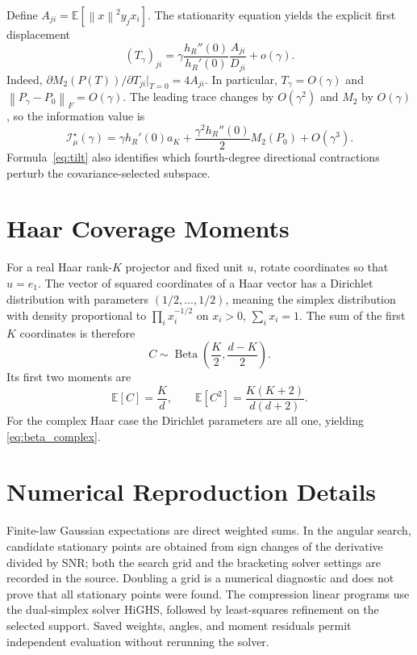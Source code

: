 \documentclass[lettersize,onecolumn]{IEEEtran}
\theoremstyle{remark}
\theoremstyle{definition}
\newcommand{\EE}{\mathbb E}
\newcommand{\norm}[1]{\left\lVert #1\right\rVert}
\newcommand{\I}{\mathcal I}
\begin{document}
Define $A_{ji}=\EE[\norm x^2y_jx_i]$. The stationarity equation yields the explicit first displacement
\begin{equation}
(T_\gamma)_{ji}=\gamma\frac{h_R''(0)}{h_R'(0)}\frac{A_{ji}}{D_{ji}}+o(\gamma).
\label{eq:tilt}
\end{equation}
Indeed, $\partial M_2(P(T))/\partial T_{ji}|_{T=0}=4A_{ji}$. In particular, $T_\gamma=O(\gamma)$ and $\norm{P_\gamma-P_0}_F=O(\gamma)$. The leading trace changes by $O(\gamma^2)$ and $M_2$ by $O(\gamma)$, so the information value is
\begin{equation}
\I_\mu^\star(\gamma)=\gamma h_R'(0)a_K+\frac{\gamma^2h_R''(0)}2M_2(P_0)+O(\gamma^3).
\end{equation}
Formula~\eqref{eq:tilt} also identifies which fourth-degree directional contractions perturb the covariance-selected subspace.

\section{Haar Coverage Moments}
For a real Haar rank-$K$ projector and fixed unit $u$, rotate coordinates so that $u=e_1$. The vector of squared coordinates of a Haar vector has a Dirichlet distribution with parameters $(1/2,\ldots,1/2)$, meaning the simplex distribution with density proportional to $\prod_i x_i^{-1/2}$ on $x_i>0$, $\sum_i x_i=1$. The sum of the first $K$ coordinates is therefore
\begin{equation}
C\sim\operatorname{Beta}\left(\frac K2,\frac{d-K}{2}\right).
\end{equation}
Its first two moments are
\begin{equation}
\EE[C]=\frac Kd,
\qquad
\EE[C^2]=\frac{K(K+2)}{d(d+2)}.
\end{equation}
For the complex Haar case the Dirichlet parameters are all one, yielding \eqref{eq:beta_complex}.

\section{Numerical Reproduction Details}
Finite-law Gaussian expectations are direct weighted sums. In the angular search, candidate stationary points are obtained from sign changes of the derivative divided by SNR; both the search grid and the bracketing solver settings are recorded in the source. Doubling a grid is a numerical diagnostic and does not prove that all stationary points were found. The compression linear programs use the dual-simplex solver HiGHS, followed by least-squares refinement on the selected support. Saved weights, angles, and moment residuals permit independent evaluation without rerunning the solver.
\end{document}
